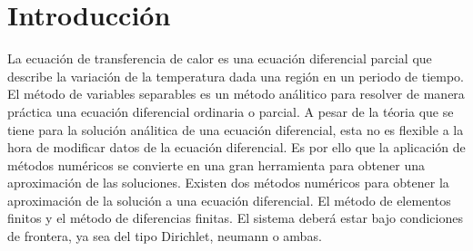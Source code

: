\section{Introducción}

La ecuación de transferencia de calor es una ecuación diferencial parcial que describe la variación de la temperatura dada una región en un periodo de tiempo. El método de variables separables es un método análitico para resolver de manera práctica una ecuación diferencial ordinaria o parcial. A pesar de la téoria que se tiene para la solución análitica de una ecuación diferencial, esta no es flexible a la hora de modificar datos de la ecuación diferencial. Es por ello que la aplicación de métodos numéricos se convierte en una gran herramienta para obtener una aproximación de las soluciones\cite{chavarria_2019}. Existen dos métodos numéricos para obtener la aproximación de la solución a una ecuación diferencial. El método de elementos finitos y el método de diferencias finitas\cite{quintana_2016}. El sistema deberá estar bajo condiciones de frontera, ya sea del tipo Dirichlet, neumann o ambas.
